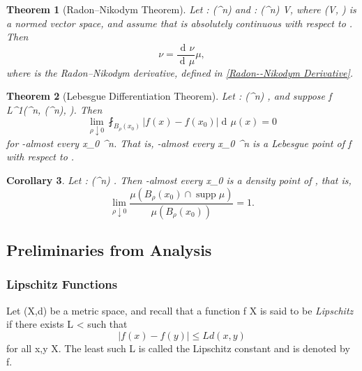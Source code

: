 \documentclass[a4paper, 11pt]{article}
\theoremstyle{plain}
\newtheorem{theorem}{Theorem}[section]
\newtheorem{corollary}[theorem]{Corollary}
\theoremstyle{definition}
\theoremstyle{remark}
\DeclareMathOperator{\diff}{d \!}
\DeclareMathOperator{\lip}{Lip}
\newcommand{\norm}[1]{\left\lVert#1\right\rVert}
\numberwithin{equation}{subsection}
\def\({}
\def\){}
\begin{document}
\begin{theorem}[Radon--Nikodym Theorem]
Let \(\mu : (^{n}) \rightarrow [0, +\infty]\) and \(\nu : (^{n}) \rightarrow V\), where \((V, \norm{\cdot})\) is a normed vector space, and assume that \(\nu\) is \emph{absolutely continuous} with respect to \(\mu\). Then
\begin{equation}
\nu = \frac{\diff\nu}{\diff\mu} \mu,
\end{equation}
where \(\frac{\diff\nu}{\diff\mu}\) is the \emph{Radon--Nikodym derivative}, defined in \eqref{Radon--Nikodym Derivative}.
\end{theorem}

\begin{theorem}[Lebesgue Differentiation Theorem]
Let \(\mu : (^{n}) \rightarrow [0, +\infty]\), and suppose \(f \in L^{1}(^{n}, (^{n}), \mu)\). Then
\begin{equation}
\lim_{\rho \downarrow 0} \fint_{B_{\rho}(x_{0})}\vert f(x) - f(x_{0}) \vert \diff\mu(x) = 0
\end{equation}
for \(\mu\)-almost every \(x_{0} \in {}^{n}\). That is, \(\mu\)-almost every \(x_{0} \in {}^{n}\) is a \emph{Lebesgue point} of \(f\) with respect to \(\mu\).
\end{theorem}

\begin{corollary}
Let \(\mu : (^{n}) \rightarrow [0, +\infty]\). Then \(\mu\)-almost every \(x_{0} \in {} \mu\) is a \emph{density point} of \(\mu\), that is,
\begin{equation}
\lim_{\rho \downarrow 0} \frac{\mu(B_{\rho}(x_{0}) \cap \operatorname{supp} \mu)}{\mu(B_{\rho}(x_{0}))} = 1.
\end{equation}
\end{corollary}

\subsection{Preliminaries from Analysis}

\subsubsection{Lipschitz Functions}

Let \((X,d)\) be a metric space, and recall that a function \(f \vcentcolon X \rightarrow {}\) is said to be  \emph{Lipschitz} if there exists \(L < \infty\) such that
\begin{equation}
\left|f(x) - f(y)\right| \leqslant L d(x,y)
\end{equation}
for all \(x,y \in X\). The least such \(L\) is called the Lipschitz constant and is denoted by \(\lip f\).
\end{document}
